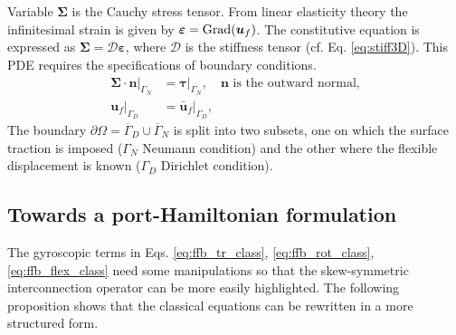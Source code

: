 \begin{itemize}
\begin{equation}
	\end{equation}
	Variable $\bm\Sigma$ is the Cauchy stress tensor. From linear elasticity theory the infinitesimal strain is given by $\bm\varepsilon = \operatorname*{Grad}(\bm{u}_f)$. The constitutive equation is expressed as $\bm\Sigma =  \bm{\mathcal{D}} \bm\varepsilon$, where $ \bm{\mathcal{D}}$ is the stiffness tensor (cf. Eq. \eqref{eq:stiff3D}). This PDE requires the specifications of boundary conditions.
	\begin{equation}
	\label{eq:bc_Elas_MB}
	\begin{aligned}
	\bm\Sigma \cdot \bm{n}|_{\Gamma_N} &= \bm\tau|_{\Gamma_N}, \quad \text{$\bm{n}$ is the outward normal,} \\
	\bm{u}_f|_{\Gamma_D} &= \bm{\bar{u}}_f|_{\Gamma_D},
	\end{aligned}
	\end{equation}
	The boundary $\partial \Omega = \overline{\Gamma}_D \cup \overline{\Gamma}_N$ is split into two subsets, one on which the surface traction is imposed ($\Gamma_N$ Neumann condition) and the other where the flexible displacement is known ($\Gamma_D$ Dirichlet condition).
\end{itemize}

\subsection{Towards a port-Hamiltonian formulation}
The gyroscopic terms in Eqs. \eqref{eq:ffb_tr_class}, \eqref{eq:ffb_rot_class}, \eqref{eq:ffb_flex_class} need some manipulations so that the skew-symmetric interconnection operator can be more easily highlighted. The following proposition shows that the classical equations can be rewritten in a more structured form.

